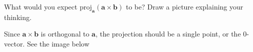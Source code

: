 \documentclass[12pt]{exam}
\newcommand{\ba}{\bm{a}}
\newcommand{\bb}{\bm{b}}
\begin{document}
\begin{questions}
\question What would you expect \(\mathrm{proj}_{\ba}(\ba\times\bb)\) to be? Draw a picture explaining your thinking.

\ifprintanswers
        \begin{solution}
            Since \(\ba\times\bb\) is orthogonal to \(\ba\), the projection should be a single point, or the 0-vector. See the image below
            \begin{center}
            \end{center}
        \end{solution}
    \else
        \vfill
    \fi    

\end{questions}

\end{document}
